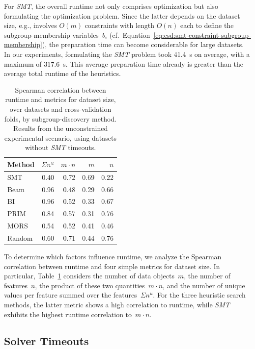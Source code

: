 \documentclass{article}
\theoremstyle{definition}
\begin{document}
For \emph{SMT}, the overall runtime not only comprises optimization but also formulating the optimization problem.
Since the latter depends on the dataset size, e.g., involves $O(m)$ constraints with length $O(n)$ each to define the subgroup-membership variables~$b_i$ (cf.~Equation~\ref{eq:csd:smt-constraint-subgroup-membership}), the preparation time can become considerable for large datasets.
In our experiments, formulating the \emph{SMT} problem took 41.4~s on average, with a maximum of 317.6~s.
This average preparation time already is greater than the average total runtime of the heuristics.

\begin{table}[t]
	\centering
	\begin{tabular}{lrrrr}
		\toprule
		Method & $\Sigma n^u$ & $m \cdot n$ & $m$ & $n$ \\
		\midrule
		SMT & 0.40 & 0.72 & 0.69 & 0.22 \\
		Beam & 0.96 & 0.48 & 0.29 & 0.66 \\
		BI & 0.96 & 0.52 & 0.33 & 0.67 \\
		PRIM & 0.84 & 0.57 & 0.31 & 0.76 \\
		MORS & 0.54 & 0.52 & 0.41 & 0.46 \\
		Random & 0.60 & 0.71 & 0.44 & 0.76 \\
		\bottomrule
	\end{tabular}
	\caption{
		Spearman correlation between runtime and metrics for dataset size,
		over datasets and cross-validation folds, by subgroup-discovery method.
		Results from the unconstrained experimental scenario, using datasets without \emph{SMT} timeouts.
	}
	\label{tab:csd:unconstrained-runtime-correlation}
\end{table}

To determine which factors influence runtime, we analyze the Spearman correlation between runtime and four simple metrics for dataset size.
In particular, Table~\ref{tab:csd:unconstrained-runtime-correlation} considers the number of data objects~$m$, the number of features~$n$, the product of these two quantities~$m \cdot n$, and the number of unique values per feature summed over the features~$\Sigma n^u$.
For the three heuristic search methods, the latter metric shows a high correlation to runtime, while \emph{SMT} exhibits the highest runtime correlation to~$m \cdot n$.

\subsection{Solver Timeouts}
\label{sec:csd:evaluation:timeouts}
\end{document}
